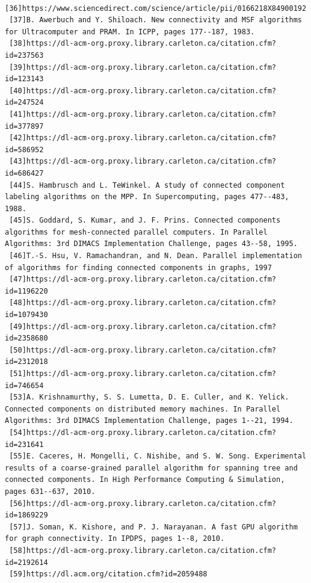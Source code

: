 \documentclass[]{article}
\begin{document}
\begin{verbatim}
 [36]https://www.sciencedirect.com/science/article/pii/0166218X84900192
 [37]B. Awerbuch and Y. Shiloach. New connectivity and MSF algorithms for Ultracomputer and PRAM. In ICPP, pages 177--187, 1983.
 [38]https://dl-acm-org.proxy.library.carleton.ca/citation.cfm?id=237563
 [39]https://dl-acm-org.proxy.library.carleton.ca/citation.cfm?id=123143
 [40]https://dl-acm-org.proxy.library.carleton.ca/citation.cfm?id=247524
 [41]https://dl-acm-org.proxy.library.carleton.ca/citation.cfm?id=377897
 [42]https://dl-acm-org.proxy.library.carleton.ca/citation.cfm?id=586952
 [43]https://dl-acm-org.proxy.library.carleton.ca/citation.cfm?id=686427
 [44]S. Hambrusch and L. TeWinkel. A study of connected component labeling algorithms on the MPP. In Supercomputing, pages 477--483, 1988.
 [45]S. Goddard, S. Kumar, and J. F. Prins. Connected components algorithms for mesh-connected parallel computers. In Parallel Algorithms: 3rd DIMACS Implementation Challenge, pages 43--58, 1995.
 [46]T.-S. Hsu, V. Ramachandran, and N. Dean. Parallel implementation of algorithms for finding connected components in graphs, 1997
 [47]https://dl-acm-org.proxy.library.carleton.ca/citation.cfm?id=1196220
 [48]https://dl-acm-org.proxy.library.carleton.ca/citation.cfm?id=1079430
 [49]https://dl-acm-org.proxy.library.carleton.ca/citation.cfm?id=2358680
 [50]https://dl-acm-org.proxy.library.carleton.ca/citation.cfm?id=2312018
 [51]https://dl-acm-org.proxy.library.carleton.ca/citation.cfm?id=746654
 [53]A. Krishnamurthy, S. S. Lumetta, D. E. Culler, and K. Yelick. Connected components on distributed memory machines. In Parallel Algorithms: 3rd DIMACS Implementation Challenge, pages 1--21, 1994.
 [54]https://dl-acm-org.proxy.library.carleton.ca/citation.cfm?id=231641
 [55]E. Caceres, H. Mongelli, C. Nishibe, and S. W. Song. Experimental results of a coarse-grained parallel algorithm for spanning tree and connected components. In High Performance Computing & Simulation, pages 631--637, 2010.
 [56]https://dl-acm-org.proxy.library.carleton.ca/citation.cfm?id=1869229
 [57]J. Soman, K. Kishore, and P. J. Narayanan. A fast GPU algorithm for graph connectivity. In IPDPS, pages 1--8, 2010.
 [58]https://dl-acm-org.proxy.library.carleton.ca/citation.cfm?id=2192614
 [59]https://dl.acm.org/citation.cfm?id=2059488
  \end{verbatim}
\end{document}
